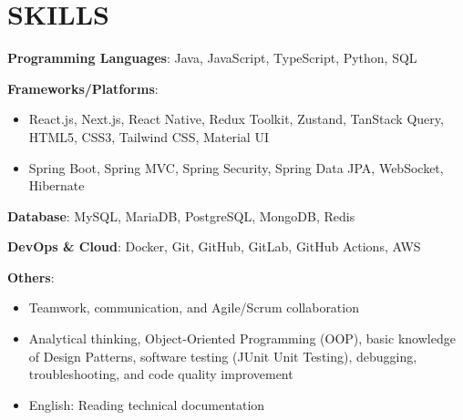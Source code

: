 \section{SKILLS}
\resumeSubHeadingListStart

  \item
    \resumeItemListStart
      \item \textbf{Programming Languages}: Java, JavaScript, TypeScript, Python, SQL
      \item \textbf{Frameworks/Platforms}:
        \begin{itemize}
          \item React.js, Next.js, React Native, Redux Toolkit, Zustand, TanStack Query, HTML5, CSS3, Tailwind CSS, Material UI
          \item Spring Boot, Spring MVC, Spring Security, Spring Data JPA, WebSocket, Hibernate
        \end{itemize}
      \item \textbf{Database}: MySQL, MariaDB, PostgreSQL, MongoDB, Redis
      \item \textbf{DevOps \& Cloud}: Docker, Git, GitHub, GitLab, GitHub Actions, AWS
      \item \textbf{Others}:
        \begin{itemize}
          \item Teamwork, communication, and Agile/Scrum collaboration
          \item Analytical thinking, Object-Oriented Programming (OOP), basic knowledge of Design Patterns, software testing (JUnit Unit Testing), debugging, troubleshooting, and code quality improvement
          \item English: Reading technical documentation
        \end{itemize}
    \resumeItemListEnd

\resumeSubHeadingListEnd
